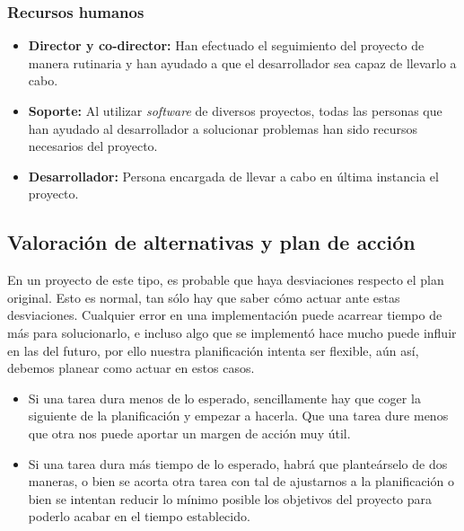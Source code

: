 \subsubsection{Recursos humanos}

\begin{itemize}
 \item \textbf{Director y co-director: } Han efectuado el seguimiento del proyecto de manera rutinaria y han ayudado a que el desarrollador sea capaz de llevarlo a cabo. 
 \item \textbf{Soporte: } Al utilizar \textit{software} de diversos proyectos, todas las personas que han ayudado al desarrollador a solucionar problemas han sido recursos necesarios del proyecto.
 \item \textbf{Desarrollador: } Persona encargada de llevar a cabo en última instancia el proyecto.
\end{itemize}

\subsection{Valoración de alternativas y plan de acción}

En un proyecto de este tipo, es probable que haya desviaciones respecto el plan original. Esto es normal, tan sólo hay que saber cómo actuar ante estas desviaciones. Cualquier error en una implementación puede acarrear tiempo de más para solucionarlo, e incluso algo que se implementó hace mucho puede influir en las del futuro, por ello nuestra planificación intenta ser flexible, aún así, debemos planear como actuar en estos casos.

\begin{itemize}
 \item Si una tarea dura menos de lo esperado, sencillamente hay que coger la siguiente de la planificación y empezar a hacerla. Que una tarea dure menos que otra nos puede aportar un margen de acción muy útil.
 \item Si una tarea dura más tiempo de lo esperado, habrá que planteárselo de dos maneras, o bien se acorta otra tarea con tal de ajustarnos a la planificación o bien se intentan reducir lo mínimo posible los objetivos del proyecto para poderlo acabar en el tiempo establecido.
\end{itemize}


